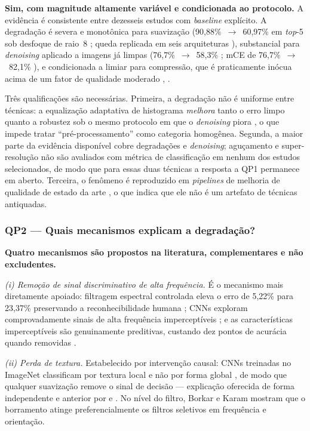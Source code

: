 \documentclass[conference]{IEEEtran}
\begin{document}
\textbf{Sim, com magnitude altamente variável e condicionada ao protocolo.} A
evidência é consistente entre dezesseis estudos com \textit{baseline}
explícito. A degradação é severa e monotônica para suavização
(90,88\%~$\rightarrow$~60,97\% em \textit{top}-5 sob desfoque de raio~8
\cite{b4}; queda replicada em seis arquiteturas \cite{b5}), substancial para
\textit{denoising} aplicado a imagens já limpas
(76,7\%~$\rightarrow$~58,3\% \cite{b7}; mCE de 76,7\%~$\rightarrow$~82,1\%
\cite{b6}), e condicionada a limiar para compressão, que é praticamente inócua
acima de um fator de qualidade moderado \cite{b1}, \cite{b10}.

Três qualificações são necessárias. Primeira, a degradação não é uniforme entre
técnicas: a equalização adaptativa de histograma \emph{melhora} tanto o erro
limpo quanto a robustez sob o mesmo protocolo em que o \textit{denoising} piora
\cite{b6}, o que impede tratar ``pré-processamento'' como categoria homogênea.
Segunda, a maior parte da evidência disponível cobre degradações e
\textit{denoising}; aguçamento e super-resolução não são avaliados com métrica
de classificação em nenhum dos estudos selecionados, de modo que para essas
duas técnicas a resposta a QP1 permanece em aberto. Terceira, o fenômeno é
reproduzido em \textit{pipelines} de melhoria de qualidade de estado da arte
\cite{b12}, o que indica que ele não é um artefato de técnicas antiquadas.

\subsubsection{QP2 --- Quais mecanismos explicam a degradação?}

\textbf{Quatro mecanismos são propostos na literatura, complementares e não
excludentes.}

\emph{(i) Remoção de sinal discriminativo de alta frequência.} É o mecanismo
mais diretamente apoiado: filtragem espectral controlada eleva o erro de 5,22\%
para 23,37\% preservando a reconhecibilidade humana \cite{b14}; CNNs exploram
comprovadamente sinais de alta frequência imperceptíveis \cite{b15}; e as
características imperceptíveis são genuinamente preditivas, custando dez pontos
de acurácia quando removidas \cite{b17}.

\emph{(ii) Perda de textura.} Estabelecido por intervenção causal: CNNs
treinadas no ImageNet classificam por textura local e não por forma global
\cite{b16}, de modo que qualquer suavização remove o sinal de decisão ---
explicação oferecida de forma independente e anterior por \cite{b1} e
\cite{b2}. No nível do filtro, Borkar e Karam \cite{b25} mostram que o
borramento atinge preferencialmente os filtros seletivos em frequência e
orientação.
\end{document}
